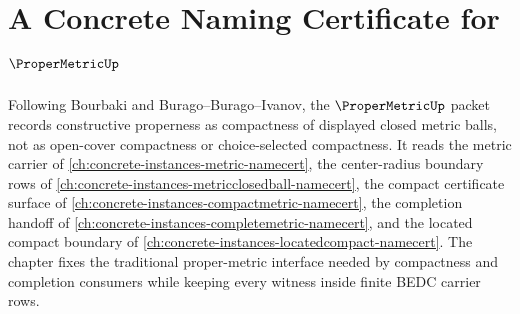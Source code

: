 \chapter{A Concrete Naming Certificate for $\ProperMetricUp$}
\label{ch:concrete-instances-propermetric-namecert}

Following Bourbaki and Burago--Burago--Ivanov, the $\ProperMetricUp$ packet records constructive properness as compactness of displayed closed metric balls, not as open-cover compactness or choice-selected compactness. It reads the metric carrier of \autoref{ch:concrete-instances-metric-namecert}, the center-radius boundary rows of \autoref{ch:concrete-instances-metricclosedball-namecert}, the compact certificate surface of \autoref{ch:concrete-instances-compactmetric-namecert}, the completion handoff of \autoref{ch:concrete-instances-completemetric-namecert}, and the located compact boundary of \autoref{ch:concrete-instances-locatedcompact-namecert}. The chapter fixes the traditional proper-metric interface needed by compactness and completion consumers while keeping every witness inside finite BEDC carrier rows.

